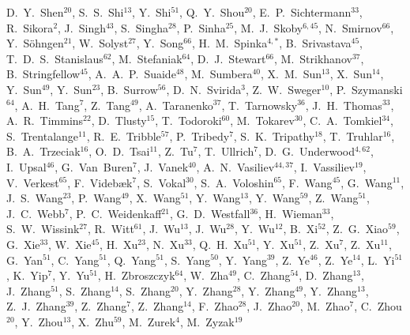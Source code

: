 {D.~Y.~Shen$^{20}$,
S.~S.~Shi$^{13}$,
Y.~Shi$^{51}$,
Q.~Y.~Shou$^{20}$,
E.~P.~Sichtermann$^{33}$,
R.~Sikora$^{2}$,
J.~Singh$^{43}$,
S.~Singha$^{28}$,
P.~Sinha$^{25}$,
M.~J.~Skoby$^{6,45}$,
N.~Smirnov$^{66}$,
Y.~S\"{o}hngen$^{21}$,
W.~Solyst$^{27}$,
Y.~Song$^{66}$,
H.~M.~Spinka$^{4,*}$,
B.~Srivastava$^{45}$,
T.~D.~S.~Stanislaus$^{62}$,
M.~Stefaniak$^{64}$,
D.~J.~Stewart$^{66}$,
M.~Strikhanov$^{37}$,
B.~Stringfellow$^{45}$,
A.~A.~P.~Suaide$^{48}$,
M.~Sumbera$^{40}$,
X.~M.~Sun$^{13}$,
X.~Sun$^{14}$,
Y.~Sun$^{49}$,
Y.~Sun$^{23}$,
B.~Surrow$^{56}$,
D.~N.~Svirida$^{3}$,
Z.~W.~Sweger$^{10}$,
P.~Szymanski$^{64}$,
A.~H.~Tang$^{7}$,
Z.~Tang$^{49}$,
A.~Taranenko$^{37}$,
T.~Tarnowsky$^{36}$,
J.~H.~Thomas$^{33}$,
A.~R.~Timmins$^{22}$,
D.~Tlusty$^{15}$,
T.~Todoroki$^{60}$,
M.~Tokarev$^{30}$,
C.~A.~Tomkiel$^{34}$,
S.~Trentalange$^{11}$,
R.~E.~Tribble$^{57}$,
P.~Tribedy$^{7}$,
S.~K.~Tripathy$^{18}$,
T.~Truhlar$^{16}$,
B.~A.~Trzeciak$^{16}$,
O.~D.~Tsai$^{11}$,
Z.~Tu$^{7}$,
T.~Ullrich$^{7}$,
D.~G.~Underwood$^{4,62}$,
I.~Upsal$^{46}$,
G.~Van~Buren$^{7}$,
J.~Vanek$^{40}$,
A.~N.~Vasiliev$^{44,37}$,
I.~Vassiliev$^{19}$,
V.~Verkest$^{65}$,
F.~Videb{\ae}k$^{7}$,
S.~Vokal$^{30}$,
S.~A.~Voloshin$^{65}$,
F.~Wang$^{45}$,
G.~Wang$^{11}$,
J.~S.~Wang$^{23}$,
P.~Wang$^{49}$,
X.~Wang$^{51}$,
Y.~Wang$^{13}$,
Y.~Wang$^{59}$,
Z.~Wang$^{51}$,
J.~C.~Webb$^{7}$,
P.~C.~Weidenkaff$^{21}$,
G.~D.~Westfall$^{36}$,
H.~Wieman$^{33}$,
S.~W.~Wissink$^{27}$,
R.~Witt$^{61}$,
J.~Wu$^{13}$,
J.~Wu$^{28}$,
Y.~Wu$^{12}$,
B.~Xi$^{52}$,
Z.~G.~Xiao$^{59}$,
G.~Xie$^{33}$,
W.~Xie$^{45}$,
H.~Xu$^{23}$,
N.~Xu$^{33}$,
Q.~H.~Xu$^{51}$,
Y.~Xu$^{51}$,
Z.~Xu$^{7}$,
Z.~Xu$^{11}$,
G.~Yan$^{51}$,
C.~Yang$^{51}$,
Q.~Yang$^{51}$,
S.~Yang$^{50}$,
Y.~Yang$^{39}$,
Z.~Ye$^{46}$,
Z.~Ye$^{14}$,
L.~Yi$^{51}$,
K.~Yip$^{7}$,
Y.~Yu$^{51}$,
H.~Zbroszczyk$^{64}$,
W.~Zha$^{49}$,
C.~Zhang$^{54}$,
D.~Zhang$^{13}$,
J.~Zhang$^{51}$,
S.~Zhang$^{14}$,
S.~Zhang$^{20}$,
Y.~Zhang$^{28}$,
Y.~Zhang$^{49}$,
Y.~Zhang$^{13}$,
Z.~J.~Zhang$^{39}$,
Z.~Zhang$^{7}$,
Z.~Zhang$^{14}$,
F.~Zhao$^{28}$,
J.~Zhao$^{20}$,
M.~Zhao$^{7}$,
C.~Zhou$^{20}$,
Y.~Zhou$^{13}$,
X.~Zhu$^{59}$,
M.~Zurek$^{4}$,
M.~Zyzak$^{19}$
}

\address{\rm{(STAR Collaboration)}}

